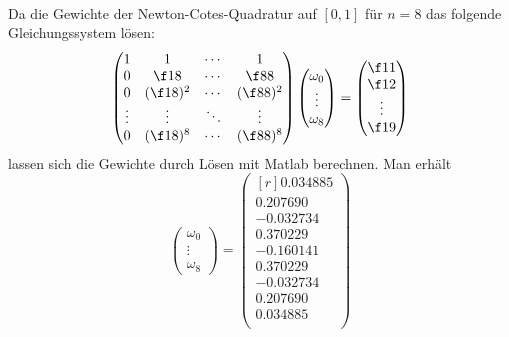 \documentclass{mywork}
\begin{document}
\begin{aufgabe}~

	Da die Gewichte der Newton-Cotes-Quadratur auf $[0,1]$ für $n=8$ das folgende Gleichungssystem lösen:
	\begin{align*}
		\begin{pmatrix}
			1 & 1 & \cdots & 1 \\
			0 & \f 18 & \cdots & \f 88 \\
			0 & (\f 18)^2 & \cdots & (\f 88)^2 \\
			\vdots & \vdots & \ddots & \vdots \\
			0 & (\f 18)^8 & \cdots & (\f 88)^8 
		\end{pmatrix}
		\begin{pmatrix}
			\omega_0 \\ \vdots \\ \omega_8
		\end{pmatrix}
		=
		\begin{pmatrix}
			\f 11 \\ \f 12 \\ \vdots \\ \f 19
		\end{pmatrix}
	\end{align*}
	lassen sich die Gewichte durch Lösen mit Matlab berechnen.
	Man erhält
	\[
		\begin{pmatrix}
			\omega_0 \\ \vdots \\ \omega_8
		\end{pmatrix}
		=
		\begin{pmatrix}[r]
			0.034885 \\
			0.207690\\
			-0.032734\\
			0.370229\\
			-0.160141\\
			0.370229\\
			-0.032734\\
			0.207690\\
			0.034885\\
   		\end{pmatrix}
	\]
\end{aufgabe}
\end{document}
